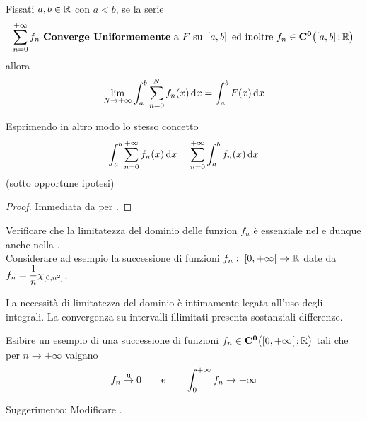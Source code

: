 \begin{corollary}
	Fissati $a, b \in \mathbb{R}$ con $a < b$, se la serie
	\[\sum\limits_{n = 0}^{+\infty} f_n \text{ \textbf{Converge Uniformemente} a } F \text{ su } \left[a,b\right] \text{ ed inoltre } f_n \in \mathbf{C^{0}}\bigl( \left[a,b\right]; \mathbb{R} \bigr)\]
	allora
	\[\lim\limits_{N \to +\infty} \int_{a}^{b} \sum\limits_{n = 0}^{N} f_n(x) \,\mathrm{d}{x} = \int_{a}^{b} F(x) \,\mathrm{d}{x}\]
	\begin{note}
		Esprimendo in altro modo lo stesso concetto
		\[
			\int_{a}^{b} \sum\limits_{n = 0}^{+\infty} f_n(x) \,\mathrm{d}{x} =
			\sum\limits_{n = 0}^{+\infty} \int_{a}^{b} f_n(x) \,\mathrm{d}{x}
		\]
		(sotto opportune ipotesi)
	\end{note}
	\begin{proof}
		Immediata da  per .
	\end{proof}
\end{corollary}
\begin{exercise}
	\label{ex:verif_imporanz_limit_dom_integr}
	Verificare che la limitatezza del dominio delle funzion $f_n$ è essenziale nel  e dunque anche nella .\\
	Considerare ad esempio la successione di funzioni $f_n:\; \left[0,+\infty\right[ \to \mathbb{R}$ date da $\displaystyle f_n = \frac{1}{n}\chi_{\left[0,n^2\right]}$.
	\begin{solution}
		La necessità di limitatezza del dominio è intimamente legata all'uso degli integrali. La convergenza su intervalli illimitati presenta sostanziali differenze.
	\end{solution}
\end{exercise}
\begin{exercise}
	Esibire un esempio di una successione di funzioni $f_n \in \mathbf{C^{0}} \bigl( \left[0,+\infty\right[; \mathbb{R} \bigr)$ tali che per $n \to +\infty$ valgano
	\[f_n \overset{\text{u}}{\to} 0 \qquad \text{e} \qquad \int_{0}^{+\infty} f_n \to +\infty\]
	\begin{solution}
		Suggerimento: Modificare .
	\end{solution}
\end{exercise}
